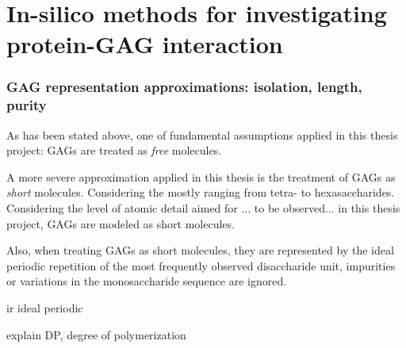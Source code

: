 \section{In-silico methods for investigating protein-GAG interaction}


\subsubsection{GAG representation approximations: isolation, length, purity}

As has been stated above, one of fundamental assumptions applied in this thesis
project: GAGs are treated as \textit{free} molecules.


A more severe approximation applied in this thesis is the treatment of GAGs as
\textit{short} molecules. Considering the  mostly ranging from tetra- to hexasaccharides. Considering the level of atomic detail aimed for ... to be observed... in this
thesis project, GAGs are modeled as short molecules.


Also, when treating GAGs as short molecules, they are represented by the ideal
periodic repetition of the most frequently observed disaccharide unit,
impurities or variations in the monosaccharide sequence are ignored.

ir ideal periodic

explain DP, degree of polymerization



